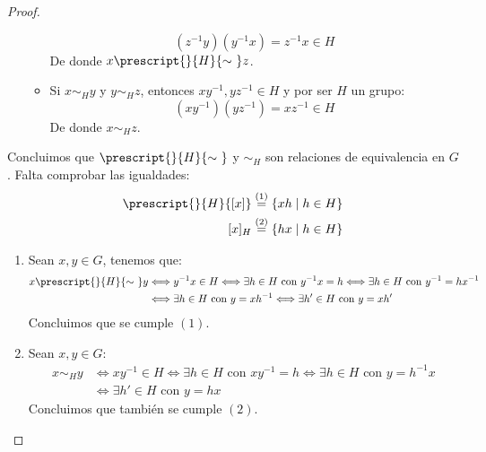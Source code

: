 \begin{prop}
\begin{proof}
\begin{itemize}
\begin{itemize}
                        \begin{equation*}
                            (z^{-1}y)(y^{-1}x) = z^{-1}x \in H
                        \end{equation*}
                        De donde $x\prescript{}{H}{\sim\ } z$.
                    \item Si $x\sim_H y$ y $y\sim_H z$, entonces $xy^{-1},yz^{-1}\in H$ y por ser $H$ un grupo:
                        \begin{equation*}
                            (xy^{-1})(yz^{-1}) = xz^{-1} \in H
                        \end{equation*}
                        De donde $x\sim_H z$.
                \end{itemize}
        \end{itemize}
        Concluimos que $\prescript{}{H}{\sim\ }$ y $\sim_H$ son relaciones de equivalencia en $G$. Falta comprobar las igualdades:
    \begin{align*}
        \prescript{}{H}{[x]} &\stackrel{(1)}{=} \{xh \mid h\in H\} \\
        [x]_H &\stackrel{(2)}{=} \{hx \mid h\in H\}
    \end{align*}
    \begin{enumerate}
        \item Sean $x,y\in G$, tenemos que:
            \begin{align*}
                x\prescript{}{H}{\sim\ } y &\Longleftrightarrow y^{-1}x \in H \Longleftrightarrow \exists h\in H \text{\ con\ } y^{-1}x = h \Longleftrightarrow \exists h\in H \text{\ con\ } y^{-1} = hx^{-1} \\
                                           &\Longleftrightarrow \exists h\in H \text{\ con\ } y=xh^{-1} \Longleftrightarrow \exists h'\in H\text{\ con\ } y = xh'
            \end{align*}
            Concluimos que se cumple $(1)$.
        \item Sean $x,y\in G$:
            \begin{align*}
                x\sim_H y &\Longleftrightarrow xy^{-1}\in  H \Longleftrightarrow \exists h\in H \text{\ con\ } xy^{-1} = h \Longleftrightarrow \exists h\in H \text{\ con\ } y = h^{-1}x \\
                          &\Longleftrightarrow \exists h'\in H \text{\ con\ } y=hx
            \end{align*}
            Concluimos que también se cumple $(2)$.
    \end{enumerate}
    \end{proof}
\end{prop}

